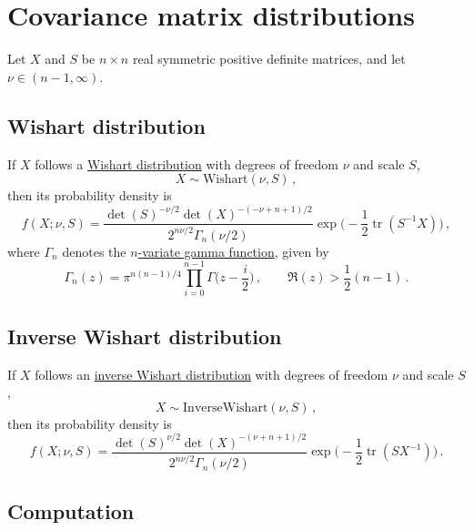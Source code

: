 \documentclass[12pt]{article}
\DeclareMathOperator{\tr}{tr}
\begin{document}
\section{Covariance matrix distributions}

Let $X$ and $S$ be $n \times n$ real symmetric positive definite matrices,
and let $\nu \in (n - 1, \infty)$.

\subsection{Wishart distribution}

If $X$ follows a
\href{https://mc-stan.org/docs/2_27/functions-reference/wishart-distribution.html}{Wishart distribution}
with degrees of freedom $\nu$ and scale $S$,
\begin{equation}
X \sim \mathrm{Wishart}(\nu,S)\,,
\end{equation}
then its probability density is
\begin{equation}
f(X;\nu,S) = \frac{\det(S)^{-\nu / 2} \det(X)^{-(-\nu + n + 1) / 2}}{2^{n \nu / 2} \Gamma_{n}(\nu / 2)} \exp\Big(-\frac{1}{2} \tr(S^{-1} X)\Big)\,,
\end{equation}
where $\Gamma_{n}$ denotes the
\href{https://en.wikipedia.org/wiki/Multivariate_gamma_function}{$n$-variate gamma function},
given by
\begin{equation}
\Gamma_{n}(z) = \pi^{n (n - 1) / 4} \prod_{i=0}^{n-1} \Gamma\Big(z - \frac{i}{2}\Big)\,,\qquad \Re(z) > \frac{1}{2}(n - 1)\,.
\end{equation}

\subsection{Inverse Wishart distribution}

If $X$ follows an
\href{https://mc-stan.org/docs/2_27/functions-reference/inverse-wishart-distribution.html}{inverse Wishart distribution}
with degrees of freedom $\nu$ and scale $S$,
\begin{equation}
X \sim \mathrm{InverseWishart}(\nu,S)\,,
\end{equation}
then its probability density is
\begin{equation}
f(X;\nu,S) = \frac{\det(S)^{\nu / 2} \det(X)^{-(\nu + n + 1) / 2}}{2^{n \nu / 2} \Gamma_{n}(\nu / 2)} \exp\Big(-\frac{1}{2} \tr(S X^{-1})\Big)\,.
\end{equation}

\subsection{Computation}
\end{document}
